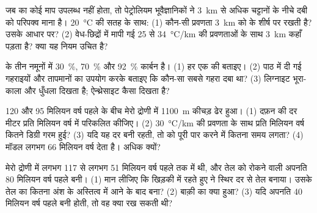 \begin{exercise}[$\star\star$]\label{exo:g11:fossil-fuel-geology:10}
जब  का कोई माप उपलब्ध नहीं होता, तो पेट्रोलियम भूवैज्ञानिकों ने
\qty{3}{km} से अधिक चट्टानों के नीचे दबी  को परिपक्व माना है।
\qty{20}{\degreeCelsius} की सतह के साथ: (1) कौन-सी प्रवणता
\qty{3}{km} को  के शीर्ष पर रखती है? उसके आधार पर? (2) वेध-छिद्रों में मापी गई
25 से \qty{34}{\degreeCelsius/km} की प्रवणताओं के साथ
\qty{3}{km} कहाँ पड़ता है? क्या यह नियम उचित है?
\end{exercise}

\begin{exercise}[$\star\star$]\label{exo:g11:fossil-fuel-geology:11}
 के तीन नमूनों में \qty{30}{\percent}, \qty{70}{\percent} और
\qty{92}{\percent} कार्बन है। (1) हर एक की  बताइए। (2) पाठ में दी गई
गहराइयों और तापमानों का उपयोग करके बताइए कि कौन-सा सबसे गहरा दबा था?
(3) लिग्नाइट भूरा-काला और धुँधला दिखता है; ऐन्थ्रेसाइट कैसा दिखता है?
\end{exercise}

\begin{exercise}[$\star\star\star$]\label{exo:g11:fossil-fuel-geology:12}
120 और 95 मिलियन वर्ष पहले के बीच मेरो द्रोणी में \qty{1100}{m} कीचड़
ढेर हुआ। (1) दफ़न की दर मीटर प्रति मिलियन वर्ष में परिकलित कीजिए।
(2) \qty{30}{\degreeCelsius/km} की प्रवणता के साथ  प्रति मिलियन वर्ष कितने डिग्री
गरम हुई? (3) यदि यह दर बनी रहती, तो  को पूरी  पार करने में
कितना समय लगता? (4) मॉडल लगभग 66 मिलियन वर्ष देता है। अधिक क्यों?
\end{exercise}

\begin{exercise}[$\star\star\star$]\label{exo:g11:fossil-fuel-geology:13}
मेरो द्रोणी में  लगभग 117 से लगभग 51 मिलियन वर्ष पहले तक
 में थी, और तेल को रोकने वाली अपनति
80 मिलियन वर्ष पहले बनी। (1) मान लीजिए कि खिड़की में रहते हुए  ने स्थिर दर से
तेल बनाया। उसके तेल का कितना अंश  के अस्तित्व में आने के बाद
बना? (2) बाक़ी का क्या हुआ? (3) यदि अपनति 40
मिलियन वर्ष पहले बनी होती, तो वह क्या रख सकती थी?
\end{exercise}

